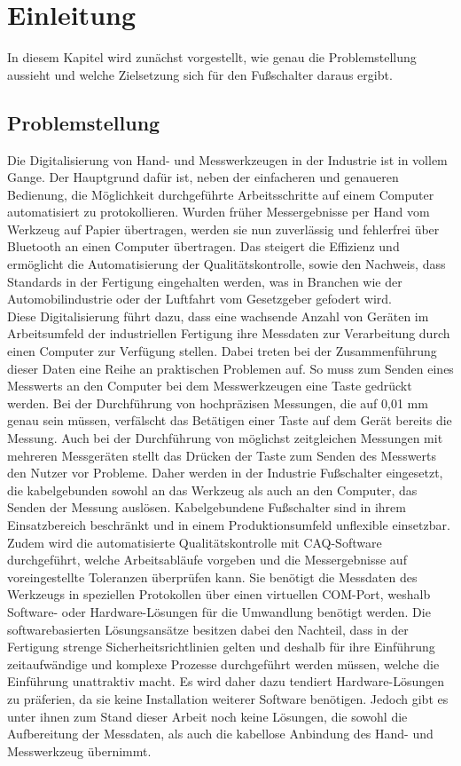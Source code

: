 \section{Einleitung}
In diesem Kapitel wird zunächst vorgestellt, wie genau die Problemstellung aussieht und welche Zielsetzung sich für den Fußschalter daraus ergibt.

\subsection{Problemstellung}
Die Digitalisierung von Hand- und Messwerkzeugen in der Industrie ist in vollem Gange. Der Hauptgrund dafür ist, neben der einfacheren und genaueren Bedienung, die Möglichkeit durchgeführte Arbeitsschritte auf einem Computer automatisiert zu protokollieren. Wurden früher Messergebnisse per Hand vom Werkzeug auf Papier übertragen, werden sie nun zuverlässig und fehlerfrei über Bluetooth an einen Computer übertragen. Das steigert die Effizienz und ermöglicht die Automatisierung der Qualitätskontrolle, sowie den Nachweis, dass Standards in der Fertigung eingehalten werden, was in Branchen wie der Automobilindustrie oder der Luftfahrt vom Gesetzgeber gefodert wird.\\
Diese Digitalisierung führt dazu, dass eine wachsende Anzahl von Geräten im Arbeitsumfeld der industriellen Fertigung ihre Messdaten zur Verarbeitung durch einen Computer zur Verfügung stellen. Dabei treten bei der Zusammenführung dieser Daten eine Reihe an praktischen Problemen auf. So muss zum Senden eines Messwerts an den Computer bei dem Messwerkzeugen eine Taste gedrückt werden. Bei der Durchführung von hochpräzisen Messungen, die auf 0,01 mm genau sein müssen, verfälscht das Betätigen einer Taste auf dem Gerät bereits die Messung. Auch bei der Durchführung von möglichst zeitgleichen Messungen mit mehreren Messgeräten stellt das Drücken der Taste zum Senden des Messwerts den Nutzer vor Probleme. Daher werden in der Industrie Fußschalter eingesetzt, die kabelgebunden sowohl an das Werkzeug als auch an den Computer, das Senden der Messung auslösen. Kabelgebundene Fußschalter sind in ihrem Einsatzbereich beschränkt und in einem Produktionsumfeld unflexible einsetzbar.\\
Zudem wird die automatisierte Qualitätskontrolle mit \ac{CAQ}-Software durchgeführt, welche Arbeitsabläufe vorgeben und die Messergebnisse auf voreingestellte Toleranzen überprüfen kann. Sie benötigt die Messdaten des Werkzeugs in speziellen Protokollen über einen virtuellen COM-Port, weshalb Software- oder Hardware-Lösungen für die Umwandlung benötigt werden. Die softwarebasierten Lösungsansätze besitzen dabei den Nachteil, dass in der Fertigung strenge Sicherheitsrichtlinien gelten und deshalb für ihre Einführung zeitaufwändige und komplexe Prozesse durchgeführt werden müssen, welche die Einführung unattraktiv macht. Es wird daher dazu tendiert Hardware-Lösungen zu präferien, da sie keine Installation weiterer Software benötigen. Jedoch gibt es unter ihnen zum Stand dieser Arbeit noch keine Lösungen, die sowohl die Aufbereitung der Messdaten, als auch die kabellose Anbindung des Hand- und Messwerkzeug übernimmt.\\
